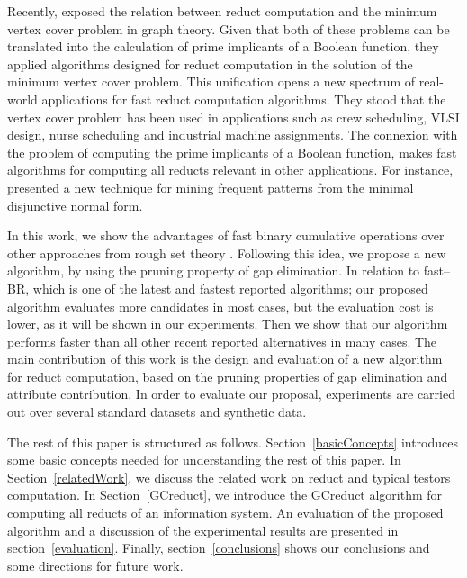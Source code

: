 \documentclass[authoryear,preprint,review,12pt]{elsarticle}
\begin{document}
  Recently, \cite{chen2015} exposed the relation between reduct computation and the minimum vertex cover
  problem in graph theory. Given that both of these problems can be translated into the calculation of
  prime implicants of a Boolean function, they applied algorithms designed for reduct computation in the
  solution of the minimum vertex cover problem. This unification opens a new spectrum of real-world applications
  for fast reduct computation algorithms. They stood that the vertex cover problem has been used in applications 
  such as crew scheduling, VLSI design, nurse scheduling and industrial machine assignments.
  The connexion with the problem of computing the prime implicants of a Boolean function, makes fast 
  algorithms for computing all reducts relevant in other applications. For instance, \cite{Li2015} presented a new technique for mining frequent patterns from the minimal disjunctive normal form.

  In this work, we show the advantages of fast binary cumulative operations \citep{Sanchez10,Lias13} over other 
  approaches from rough set theory \citep{WangP07,Jensen14}. Following this idea, we propose a new algorithm, by using the pruning property of gap elimination. In relation to fast--BR, which is one of the latest and fastest reported algorithms; our proposed algorithm evaluates more candidates in most cases, but the evaluation cost is lower, as it will be shown in our experiments. Then we show that our algorithm performs faster than all other recent reported alternatives in
  many cases. 
  The main contribution of this work is the design and evaluation of a new algorithm for reduct computation,
  based on  the pruning properties of gap elimination and attribute contribution. In order to evaluate our proposal, experiments are carried out over several standard datasets \citep{Bache13} and synthetic data.
  
  The rest of this paper is structured as follows. Section~\ref{basicConcepts}  introduces some basic concepts needed for understanding the rest of this paper. In Section~\ref{relatedWork}, we discuss the related work on reduct and typical testors computation.  In Section~\ref{GCreduct}, we introduce the GCreduct algorithm for computing all reducts of an information system. An evaluation of the proposed algorithm and a discussion of the experimental results are presented in section~\ref{evaluation}. Finally, section~\ref{conclusions} shows our conclusions and some directions for future work.
   
\end{document}
